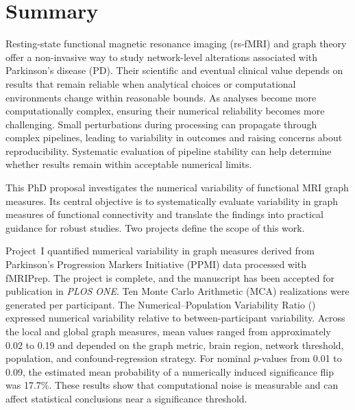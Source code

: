 \chapter*{Summary}
\begin{onehalfspace}


Resting-state functional magnetic resonance imaging (rs-fMRI) and graph theory offer a non-invasive way to study network-level alterations associated with Parkinson's disease (PD). Their scientific and eventual clinical value depends on results that remain reliable when analytical choices or computational environments change within reasonable bounds. As analyses become more computationally complex, ensuring their numerical reliability becomes more challenging. Small perturbations during processing can propagate through complex pipelines, leading to variability in outcomes and raising concerns about reproducibility. Systematic evaluation of pipeline stability can help determine whether results remain within acceptable numerical limits.

This PhD proposal investigates the numerical variability of functional MRI graph measures. Its central objective is to systematically evaluate variability in graph measures of functional connectivity and translate the findings into practical guidance for robust studies. Two projects define the scope of this work.

Project~I quantified numerical variability in graph measures derived from Parkinson's Progression Markers Initiative (PPMI) data processed with fMRIPrep. The project is complete, and the manuscript has been accepted for publication in \textit{PLOS ONE}. Ten Monte Carlo Arithmetic (MCA) realizations were generated per participant. The Numerical--Population Variability Ratio (\npvratio{}) expressed numerical variability relative to between-participant variability. Across the local and global graph measures, mean \npvratio{} values ranged from approximately 0.02 to 0.19 and depended on the graph metric, brain region, network threshold, population, and confound-regression strategy. For nominal $p$-values from 0.01 to 0.09, the estimated mean probability of a numerically induced significance flip was 17.7\%. These results show that computational noise is measurable and can affect statistical conclusions near a significance threshold.



\end{onehalfspace}
